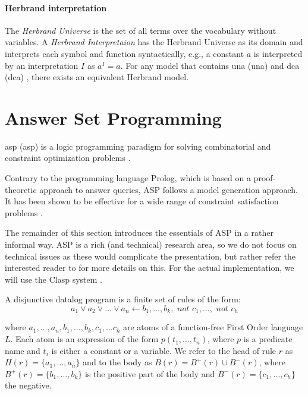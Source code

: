 \paragraph{Herbrand interpretation} The \textit{Herbrand Universe} is the set of all terms over the vocabulary without variables. A \textit{Herbrand Interpretaion} has the Herbrand Universe as its domain and interprets each symbol and function syntactically, e.g., a constant $a$ is interpreted by an interpretation $I$ as $a^I = a$. For any model that contains \acrlong{una} (\acrshort{una}) \parencite{UNA} and \acrlong{dca} (\acrshort{dca}) \parencite{DCA}, there exists an equivalent Herbrand model.


\section{Answer Set Programming}
\acrlong{asp} (\acrshort{asp}) is a logic programming paradigm for solving combinatorial and constraint optimization problems \parencite{whatisasp}.

Contrary to the programming language Prolog, which is based on a proof-theoretic approach to answer queries, ASP follows a model generation approach. It has been shown to be effective for a wide range of constraint satisfaction problems \parencite{ASPbook}.

The remainder of this section introduces the essentials of ASP in a rather informal way. ASP is a rich (and technical) research area, so we do not focus on technical issues as these would complicate the presentation, but rather refer the interested reader to \textcite{ASPbook,eiter,leone,whatisasp} for more details on this. For the actual implementation, we will use the Clasp system \parencite{ASPbook,BrewkaCACM}.

\begin{definition}
  A disjunctive datalog program is a finite set of rules of the form: 
  \begin{equation*}
    a_1 \vee a_2 \vee \dots \vee a_n \leftarrow b_1, \dots, b_k, \textit{ not }c_1,\dots,\textit{ not }c_h 
  \end{equation*}
\end{definition}
where $a_1, \dots, a_n, b_1, \dots, b_k,c_1, \dots c_h$ are atoms of a function-free First Order language $L$. Each atom is an expression of the form $p(t_1,\ldots,t_n)$, where $p$ is a predicate name and $t_i$ is either a constant or a variable. We refer to the head of rule $r$ as $H(r) = \{a_1,\dots,a_n\}$ and to the body as $B(r) = B^{+}(r) \cup B^{-}(r)$, where $B^{+}(r) = \{ b_1, \dots, b_k \}$ is the positive part of the body and $B^{-}(r) = \{ c_1, \dots, c_h \}$ the negative. 

